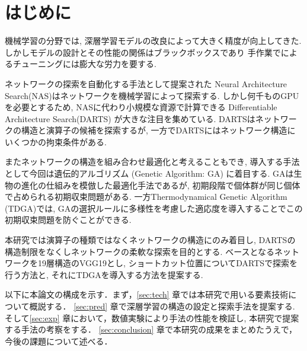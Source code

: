 \newpage
\changeindent{0cm}
\section{はじめに}
\label{sec:intro}
\changeindent{2cm}

機械学習の分野では, 深層学習モデルの改良によって大きく精度が向上してきた.
しかしモデルの設計とその性能の関係はブラックボックスであり
手作業でによるチューニングには膨大な労力を要する.

ネットワークの探索を自動化する手法として提案された
Neural Architecture Search(NAS)はネットワークを機械学習によって探索する.
しかし何千ものGPUを必要とするため, NASに代わり小規模な資源で計算できる
Differentiable Architecture Search(DARTS) が大きな注目を集めている.
DARTSはネットワークの構造と演算子の候補を探索するが,
一方でDARTSにはネットワーク構造にいくつかの拘束条件がある.

またネットワークの構造を組み合わせ最適化と考えることもでき,
導入する手法として今回は遺伝的アルゴリズム (Genetic Algorithm: GA) に着目する.
GAは生物の進化の仕組みを模倣した最適化手法であるが,
初期段階で個体群が同じ個体で占められる初期収束問題がある.
一方Thermodynamical Genetic Algorithm (TDGA)では,
GAの選択ルールに多様性を考慮した適応度を導入することでこの初期収束問題を防ぐことができる.


本研究では演算子の種類ではなくネットワークの構造にのみ着目し,
DARTSの構造制限をなくしネットワークの柔軟な探索を目的とする.
ベースとなるネットワークを19層構造のVGG19とし,
ショートカット位置についてDARTSで探索を行う方法と, それにTDGAを導入する方法を提案する.


以下に本論文の構成を示す．まず，\ref{sec:tech} 章では本研究で用いる要素技術について概説する．
\ref{sec:pred} 章で深層学習の構造の設定と探索手法を提案する.
そして\ref{sec:exp} 章において，数値実験により手法の性能を検証し, 本研究で提案する手法の考察をする．
\ref{sec:conclusion} 章で本研究の成果をまとめたうえで，今後の課題について述べる．


\begin{comment}
\end{comment}
